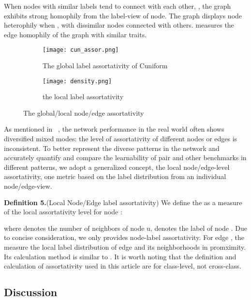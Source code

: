 \documentclass[10pt,journal,compsoc]{IEEEtran}
\begin{document}
When nodes with similar labels tend to connect with each other, , the graph exhibits strong homophily from the  label-view of node. The graph displays node heterophily when , with dissimilar nodes connected with others.  measures the edge homophily of the graph with similar traits. 

 




\begin{figure}[htb]
\centering
\begin{subfigure}{0.49\columnwidth}
\centering
\texttt{[image: cun\_assor.png]}
\caption{The global label assortativity of Cuniform}
\end{subfigure}
\begin{subfigure}{0.49\columnwidth}
\centering
\texttt{[image: density.png]}

 \caption{the local label assortativity}
\end{subfigure}
\caption{The global/local node/edge assortativity }
\label{fig:graph-assortativity}
\end{figure}
 
As mentioned in ~\cite{suresh2021breaking}, the network performance in the real world often shows diversified mixed modes: the level of assortativity of different nodes or edges is inconsistent. To better represent the diverse patterns in the network and accurately quantify and compare the learnability of pair and other benchmarks in different patterns, we adopt a generalized concept, the local node/edge-level assortativity, one metric  based on the label distribution from an individual node/edge-view. 

\noindent \textbf{Definition 5.}(Local Node/Edge label assortativity) We define the   as a measure of the local assortativity level for node :


where  denotes the number of neighbors of node u,  denotes the label of node . Due to concise consideration, we only provides node-label assortativity. For edge , the  measure the local label distribution of edge  and its neighborhoods in promximity. Its calculation method is similar to .  It is worth noting that the definition and calculation of assortativity used in this article are for class-level, not cross-class.

\subsection{Discussion}
\end{document}
